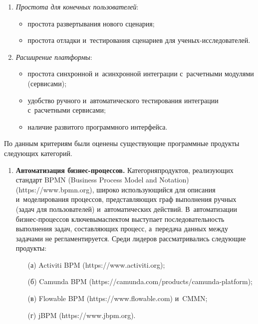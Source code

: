 \begin{multicols}{2}
\begin{enumerate}[1.]
\item \textit{Простота для конечных пользователей}:
\begin{itemize}
\item простота развертывания нового сценария;
\item простота отладки и~тестирования сценариев для  
уче\-ных-ис\-сле\-до\-ва\-те\-лей.
\end{itemize}

\item \textit{Расширение платформы}:
\begin{itemize}
\item простота синхронной и~асинхронной интеграции с~расчетными 
модулями (сервисами); 
\item удобство ручного и~автоматического тестирования интеграции 
с~расчетными сер\-ви\-сами;
\item наличие развитого программного интерфейса.
\end{itemize}
\end{enumerate}

     По данным критериям были оценены су\-ще\-ст\-ву\-ющие программные 
продукты сле\-ду\-ющих категорий.
     \begin{enumerate}[1.]
     \item \textbf{Автоматизация биз\-нес-про\-цес\-сов.} Категория\linebreak продуктов, 
реализующих стандарт BPMN (Business Process Model and Notation) ({\sf https://\linebreak www.bpmn.org}), широко 
ис\-поль\-зу\-ющий\-ся для описания и~моделирования процессов, пред\-став\-ля\-ющих 
граф выполнения ручных (задач для пользователей) и~автоматических действий. 
В~автоматизации биз\-нес-про\-цес\-сов ключевым\linebreak аспектом вы\-сту\-па\-ет 
по\-сле\-до\-ва\-тель\-ность выполнения задач, со\-став\-ля\-ющих процесс, а~передача 
данных меж\-ду задачами не регламентируется. Среди лидеров рас\-смат\-ри\-ва\-лись 
\mbox{сле\-ду\-ющие} продукты:
     \begin{itemize}
     \item[(а)] Activiti BPM ({\sf https://www.activiti.org});
     \item[(б)] 
Camunda BPM ({\sf https://camunda.com/\linebreak products/camunda-platform});
     \item[(в)] 
Flowable BPM ({\sf https://www.flowable.com}) и~CMMN;
     \item[(г)] 
jBPM ({\sf https://www.jbpm.org}).
\end{itemize}
        

\end{enumerate}
\end{multicols}
